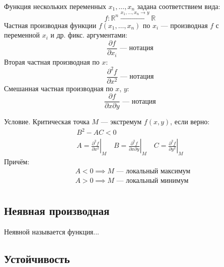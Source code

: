 {\bold Функция нескольких переменных} $x_1,\dots,x_n$ задана соответствием вида:
$$f\colon\mathbb{R}^n\xrightarrow{x_1,\dots,x_n\to y}\mathbb{R}$$
{\bold Частная производная} функции $f(x_1,\dots,x_n)$ по $x_i$ --- производная $f$ с переменной $x_i$ и др. {\ital фикс. аргументами}:
$$\frac{\partial f}{\partial x_i}\text{ --- нотация}$$
{\bold Вторая} частная производная по $x$:
$$\frac{\partial^2f}{\partial x^2}\text{ --- нотация}$$
{\bold Смешанная} частная производная по $x$, $y$:
$$\frac{\partial f}{\partial x\partial y}\text{ --- нотация}$$
\begin{theorem}
{\bold Условие.} Критическая точка $M$ --- {\ital экстремум} $f(x,y)$, если верно:
$$\begin{gathered}
B^2-AC\less 0\\
A=\left.\frac{\partial^2f}{\partial x^2}\right|_M\quad B=\left.\frac{\partial^2f}{\partial x\partial y}\right|_M\quad C=\left.\frac{\partial^2f}{\partial y^2}\right|_M
\end{gathered}$$
Причём:
$$\begin{aligned}
&A\less 0\implies M\text{ --- локальный максимум}\\
&A\greater 0\implies M\text{ --- локальный минимум}\\
\end{aligned}$$
\end{theorem}

\subsection{Неявная производная}

{\bold Неявной} называется функция...

\newpage
\subsection{Устойчивость}


